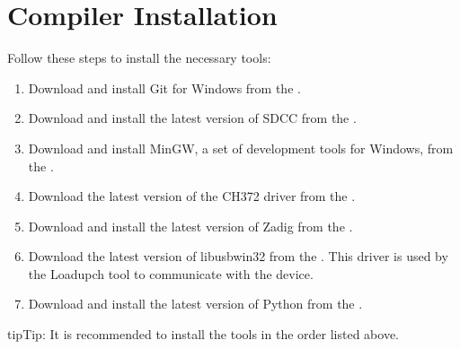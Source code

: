 \documentclass[letterpaper,10pt,english]{sphinxmanual}
\begin{document}
\section{Compiler Installation}
\label{\detokenize{install_windows:compiler-installation}}
\sphinxAtStartPar
Follow these steps to install the necessary tools:
\begin{enumerate}
%
\item {} 
\sphinxAtStartPar
{}
Download and install Git for Windows from the .

\item {} 
\sphinxAtStartPar
{}
Download and install the latest version of SDCC from the .

\item {} 
\sphinxAtStartPar
{}
Download and install MinGW, a set of development tools for Windows, from the .

\item {} 
\sphinxAtStartPar
{}
Download the latest version of the CH372 driver from the .

\item {} 
\sphinxAtStartPar
{}
Download and install the latest version of Zadig from the .

\item {} 
\sphinxAtStartPar
{}
Download the latest version of libusb\sphinxhyphen{}win32 from the . This driver is used by the Loadupch tool to communicate with the device.

\item {} 
\sphinxAtStartPar
{}
Download and install the latest version of Python from the .

\end{enumerate}

\begin{sphinxadmonition}{tip}{Tip:}
\sphinxAtStartPar
It is recommended to install the tools in the order listed above.
\end{sphinxadmonition}
\end{document}
